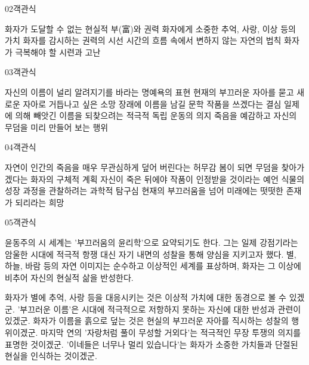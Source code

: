 \documentclass[fs85,seriesWit]{korfarm-base}
\begin{document}
\begin{kfQBlock}{02}{객관식}
\begin{kfChoices}
\kfChoice 화자가 도달할 수 없는 현실적 부(富)와 권력
\kfChoice 화자에게 소중한 추억, 사랑, 이상 등의 가치
\kfChoice 화자를 감시하는 권력의 시선
\kfChoice 시간의 흐름 속에서 변하지 않는 자연의 법칙
\kfChoice 화자가 극복해야 할 시련과 고난
\end{kfChoices}
\end{kfQBlock}

\begin{kfQBlock}{03}{객관식}
\begin{kfChoices}
\kfChoice 자신의 이름이 널리 알려지기를 바라는 명예욕의 표현
\kfChoice 현재의 부끄러운 자아를 묻고 새로운 자아로 거듭나고 싶은 소망
\kfChoice 장래에 이름을 남길 문학 작품을 쓰겠다는 결심
\kfChoice 일제에 의해 빼앗긴 이름을 되찾으려는 적극적 독립 운동의 의지
\kfChoice 죽음을 예감하고 자신의 무덤을 미리 만들어 보는 행위
\end{kfChoices}
\end{kfQBlock}

\begin{kfQBlock}{04}{객관식}
\begin{kfChoices}
\kfChoice 자연이 인간의 죽음을 매우 무관심하게 덮어 버린다는 허무감
\kfChoice 봄이 되면 무덤을 찾아가겠다는 화자의 구체적 계획
\kfChoice 자신이 죽은 뒤에야 작품이 인정받을 것이라는 예언
\kfChoice 식물의 성장 과정을 관찰하려는 과학적 탐구심
\kfChoice 현재의 부끄러움을 넘어 미래에는 떳떳한 존재가 되리라는 희망
\end{kfChoices}
\end{kfQBlock}

\begin{kfQBlock}{05}{객관식}
\begin{kfEvidence}윤동주의 시 세계는 '부끄러움의 윤리학'으로 요약되기도 한다. 그는 일제 강점기라는 암울한 시대에 적극적 항쟁 대신 자기 내면의 성찰을 통해 양심을 지키고자 했다. 별, 하늘, 바람 등의 자연 이미지는 순수하고 이상적인 세계를 표상하며, 화자는 그 이상에 비추어 자신의 현실적 삶을 반성한다.\end{kfEvidence}
\begin{kfChoices}
\kfChoice 화자가 별에 추억, 사랑 등을 대응시키는 것은 이상적 가치에 대한 동경으로 볼 수 있겠군.
\kfChoice '부끄러운 이름'은 시대에 적극적으로 저항하지 못하는 자신에 대한 반성과 관련이 있겠군.
\kfChoice 화자가 이름을 흙으로 덮는 것은 현실의 부끄러운 자아를 직시하는 성찰의 행위이겠군.
\kfChoice 마지막 연의 '자랑처럼 풀이 무성할 거외다'는 적극적인 무장 투쟁의 의지를 표명한 것이겠군.
\kfChoice '이네들은 너무나 멀리 있습니다'는 화자가 소중한 가치들과 단절된 현실을 인식하는 것이겠군.
\end{kfChoices}
\end{kfQBlock}
\end{document}
